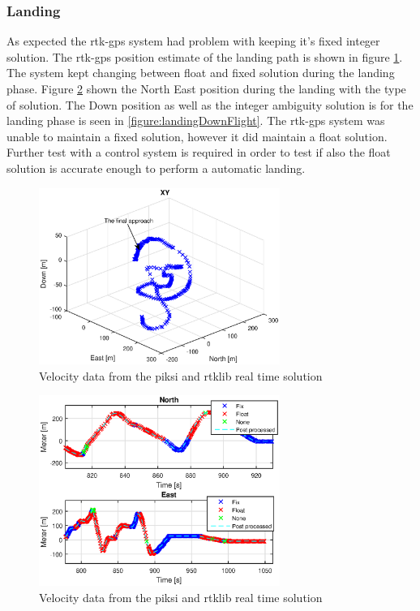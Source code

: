 \subsubsection{Landing}
As expected the \gls{rtk-gps} system had problem with keeping it's fixed integer solution. The \gls{rtk-gps} position estimate of the landing path is shown in figure \ref{figure:landingNEDFlight}. The system kept changing between float and fixed solution during the landing phase. Figure \ref{figure:landingNorthEastFlight} shown the North East position during the landing with the type of solution. The Down position as well as the integer ambiguity solution is for the landing phase is seen in \ref{figure:landingDownFlight}. The \gls{rtk-gps} system was unable to maintain a fixed solution, however it did maintain a float solution. Further test with a control system is required in order to test if also the float solution is accurate enough to perform a automatic landing.
\begin{figure}[H]
	\centering
		\includegraphics[width=0.7\textwidth]{figs/plots/landingNedFlight.eps}
		\caption{Velocity data from the piksi and rtklib real time solution}
		\label{figure:landingNEDFlight}
\end{figure}
\begin{figure}[H]
	\centering
		\includegraphics[width=0.7\textwidth]{figs/plots/landingNorthEastFlight.eps}
		\caption{Velocity data from the piksi and rtklib real time solution}
		\label{figure:landingNorthEastFlight}
\end{figure}
